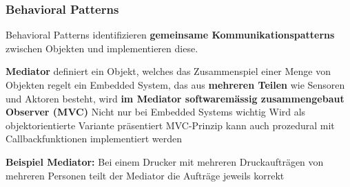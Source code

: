 \subsubsection{Behavioral Patterns}

Behavioral Patterns identifizieren \textbf{gemeinsame Kommunikationspatterns} zwischen Objekten und implementieren diese.

\vspace{0.1cm}


    

\begin{outline}
    \1 \textbf{Mediator}
        \2 definiert ein Objekt, welches das Zusammenspiel einer Menge von Objekten regelt
        \2 ein Embedded System, das aus \textbf{mehreren Teilen} wie Sensoren und Aktoren besteht, wird \textbf{im Mediator
            softwaremässig zusammengebaut}
    \1 \textbf{Observer (MVC)}
        \2 Nicht nur bei Embedded Systems wichtig
        \2 Wird als objektorientierte Variante präsentiert
        \2 MVC-Prinzip kann auch prozedural mit Callbackfunktionen implementiert werden
\end{outline}

\vspace{0.1cm}

\textbf{Beispiel Mediator:} Bei einem Drucker mit mehreren Druckaufträgen von mehreren Personen teilt der Mediator die Aufträge jeweils korrekt

